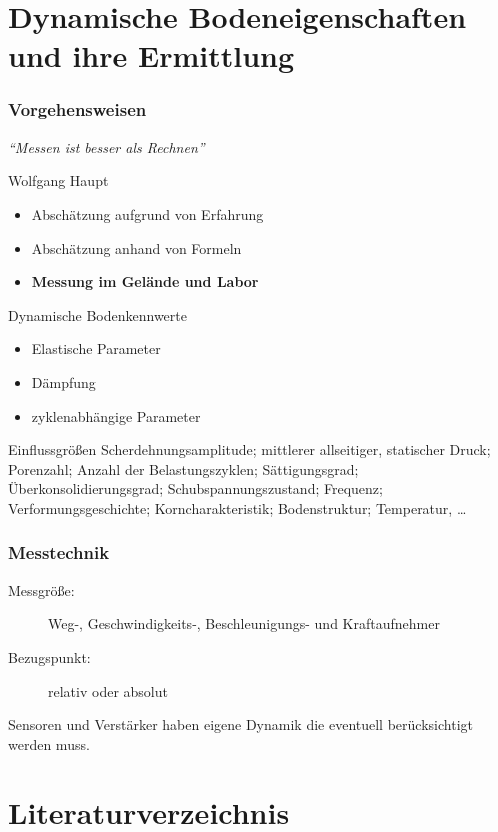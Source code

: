 \documentclass[hyperref={pdfpagemode=FullScreen, colorlinks=false}]{beamer}
\begin{document}
\maketitle


\section{Dynamische Bodeneigenschaften und ihre Ermittlung}

\begin{frame}
\frametitle{Vorgehensweisen}
\begin{center}
\Large
 \textsl{``Messen ist besser als Rechnen''}
\end{center}
\hfill Wolfgang Haupt \cite{haupt1986bodendynamik}

\vfill

\begin{itemize}
 \item Abschätzung aufgrund von Erfahrung
 \item Abschätzung anhand von Formeln
 \item \textbf{Messung im Gelände und Labor}
\end{itemize}
\end{frame}


\begin{frame}
\begin{TUBAFinblock}{Dynamische Bodenkennwerte}
\begin{itemize}
        \item Elastische Parameter
        \item Dämpfung
        \item zyklenabhängige Parameter
\end{itemize}
\end{TUBAFinblock}

\begin{TUBAFinblock}{Einflussgrößen}
Scherdehnungsamplitude; mittlerer allseitiger, statischer Druck; Porenzahl; Anzahl der Belastungszyklen; Sättigungsgrad; Überkonsolidierungsgrad; Schubspannungszustand; Frequenz; Verformungsgeschichte; Korncharakteristik; Bodenstruktur; Temperatur,  \dots 
\end{TUBAFinblock}

\end{frame}


\begin{frame}
\frametitle{Messtechnik}

\begin{description}
 \item[Messgröße:] Weg-, Geschwindigkeits-, Beschleunigungs- und Kraftaufnehmer
 \item[Bezugspunkt:] relativ oder absolut
 \item[]
\end{description}
Sensoren und Verstärker haben eigene Dynamik die eventuell berücksichtigt werden muss.
\end{frame}






\section*{Literaturverzeichnis}

\begin{frame}[allowframebreaks]{}
	\printbibliography
\end{frame}
\end{document}
